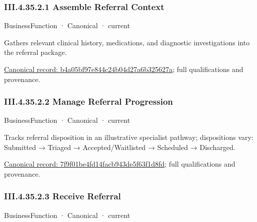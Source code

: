 \subsubsection*{III.4.35.2.1 Assemble Referral Context}
\label{navigation:III.4.35.2.1}

\label{element:b4a05bf97e844c24b04d27a6b325627a}
{\small BusinessFunction · Canonical · current}\par

Gathers relevant clinical history, medications, and diagnostic investigations into the referral package.


{\footnotesize \href{../../../../continuum/business/business-function/b4a05bf97e844c24b04d27a6b325627a.md}{Canonical record: b4a05bf97e844c24b04d27a6b325627a}; full qualifications and provenance.}\par
\subsubsection*{III.4.35.2.2 Manage Referral Progression}
\label{navigation:III.4.35.2.2}

\label{element:7f9f01be4fd14facb943de5f63f1d8fd}
{\small BusinessFunction · Canonical · current}\par

Tracks referral disposition in an illustrative specialist pathway; dispositions vary: Submitted → Triaged → Accepted/Waitlisted → Scheduled → Discharged.


{\footnotesize \href{../../../../continuum/business/business-function/7f9f01be4fd14facb943de5f63f1d8fd.md}{Canonical record: 7f9f01be4fd14facb943de5f63f1d8fd}; full qualifications and provenance.}\par
\subsubsection*{III.4.35.2.3 Receive Referral}
\label{navigation:III.4.35.2.3}

\label{element:28775f5af15646369539a4fc0a7ff8a9}
{\small BusinessFunction · Canonical · current}\par

